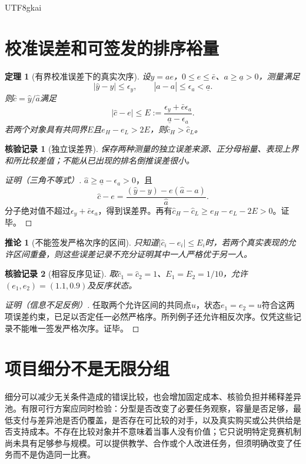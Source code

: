 \documentclass[12pt,a4paper,openany]{report}
\newtheorem{theorem}{定理}[chapter]
\newtheorem{corollary}{推论}[chapter]
\newtheorem{Certificate}{核验记录}[chapter]
\begin{document}
\begin{CJK*}{UTF8}{gkai}
\section{校准误差和可签发的排序裕量}
\begin{theorem}[有界校准误差下的真实次序]
\label{thm:calibration-error}
设$y=ae$，$0\le e\le\bar e$、$a\ge\underline a>0$，测量满足
\[
 |\widehat y-y|\le\epsilon_y,\qquad
 |\widehat a-a|\le\epsilon_a<\underline a.
\]
则$\widehat c=\widehat y/\widehat a$满足
\[
 |\widehat c-e|\le
 E:=\frac{\epsilon_y+\bar e\epsilon_a}{\underline a-\epsilon_a}.
\]
若两个对象具有共同界$E$且$e_H-e_L>2E$，则$\widehat c_H>\widehat c_L$。
\end{theorem}
\begin{Certificate}[独立误差界]
保存两种测量的独立误差来源、正分母裕量、表现上界和所比较差值；不能从已出现的排名倒推误差很小。
\end{Certificate}
\begin{proof}[证明（三角不等式）]
$\widehat a\ge\underline a-\epsilon_a>0$，且
\[
 \widehat c-e=
 \frac{(\widehat y-y)-e(\widehat a-a)}{\widehat a}.
\]
分子绝对值不超过$\epsilon_y+\bar e\epsilon_a$，得到误差界。再有$\widehat c_H-\widehat c_L\ge e_H-e_L-2E>0$。证毕。
\end{proof}
\begin{corollary}[不能签发严格次序的区间]
\label{cor:uncertain-rank}
只知道$|\widehat c_i-e_i|\le E_i$时，若两个真实表现的允许区间重叠，则这些误差记录不充分证明其中一人严格优于另一人。
\end{corollary}
\begin{Certificate}[相容反序见证]
取$\widehat c_1=\widehat c_2=1$、$E_1=E_2=1/10$，允许$(e_1,e_2)=(1.1,0.9)$及反序状态。
\end{Certificate}
\begin{proof}[证明（信息不足反例）]
任取两个允许区间的共同点$u$，状态$e_1=e_2=u$符合这两项误差约束，已足以否定任一必然严格序。所列例子还允许相反次序。仅凭这些记录不能唯一签发严格次序。证毕。
\end{proof}

\section{项目细分不是无限分组}
细分可以减少无关条件造成的错误比较，也会增加固定成本、核验负担并稀释差异池。有限可行方案应同时检验：分型是否改变了必要任务观察，容量是否足够，最低支付与差异池是否仍覆盖，是否存在可比较的对手，以及真实购买或公共供给是否支持成本。不存在比较对象并不意味着当事人没有价值；它只说明特定竞赛机制尚未具有足够参与规模。可以提供教学、合作或个人改进任务，但须明确改变了任务而不是伪造同一比赛。


\end{CJK*}
\end{document}
